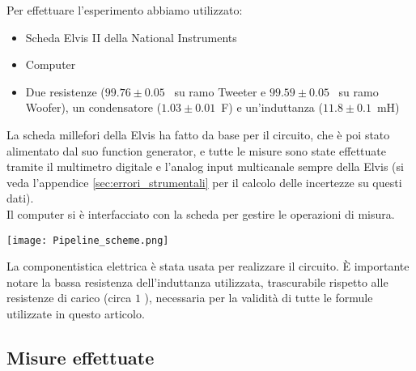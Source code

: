 \documentclass[../Relazione_circuiti]{subfiles}
\begin{document}
\begin{minipage}{.49\textwidth}
  \setlength{\parindent}{20pt}
  Per effettuare l'esperimento abbiamo utilizzato:
  \begin{itemize}
    \item Scheda Elvis II della National Instruments
    \item Computer
    \item Due resistenze ($99.76 \pm 0.05$~\textOmega \hspace{1pt} su ramo Tweeter e $99.59 \pm 0.05$~\textOmega
    \hspace{1pt} su ramo Woofer), un condensatore ($1.03 \pm 0.01 $~\textmu F) e un'induttanza ($11.8 \pm 0.1$~mH)
  \end{itemize}
  La scheda millefori della Elvis ha fatto da base per il circuito, che è poi stato alimentato dal suo function
  generator, e tutte le misure sono state effettuate tramite il multimetro digitale e l'analog input multicanale sempre
  della Elvis (si veda l'appendice \ref{sec:errori_strumentali} per il calcolo delle incertezze su questi dati). \\
  Il computer si è interfacciato con la scheda per gestire le operazioni di misura.
\end{minipage}
\hfill
\begin{minipage}{0.50\textwidth}
  \centering
  \texttt{[image: Pipeline\_scheme.png]}
\end{minipage}
La componentistica elettrica è stata usata per realizzare il circuito.
È importante notare la bassa resistenza dell'induttanza utilizzata, trascurabile rispetto alle resistenze di carico
(circa $1$ \textOmega), necessaria per la validità di tutte le formule utilizzate in questo articolo.

\subsection{Misure effettuate}\label{subsec:misure-effettuate}
\end{document}
